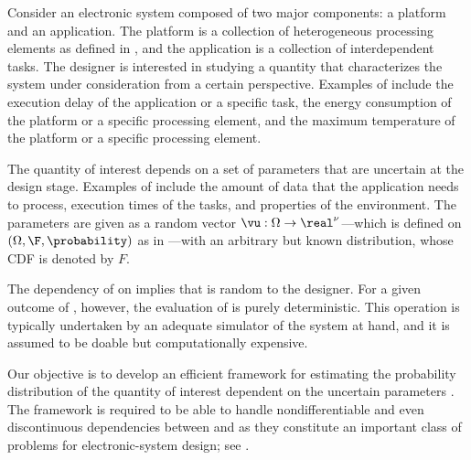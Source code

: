 Consider an electronic system composed of two major components: a platform and
an application. The platform is a collection of heterogeneous processing
elements as defined in , and the application is a collection
of interdependent tasks. The designer is interested in studying a quantity \g
that characterizes the system under consideration from a certain perspective.
Examples of \g include the execution delay of the application or a specific
task, the energy consumption of the platform or a specific processing element,
and the maximum temperature of the platform or a specific processing element.

The quantity of interest \g depends on a set of parameters \vu that are
uncertain at the design stage. Examples of \vu include the amount of data that
the application needs to process, execution times of the tasks, and properties
of the environment. The parameters \vu are given as a random vector $\vu: \Omega
\to \real^\nu$---which is defined on $(\Omega, \F, \probability)$ as in
---with an arbitrary but known distribution, whose
\ac{CDF} is denoted by $F$.

The dependency of \g on \vu implies that \g is random to the designer. For a
given outcome of \vu, however, the evaluation of \g is purely deterministic.
This operation is typically undertaken by an adequate simulator of the system at
hand, and it is assumed to be doable but computationally expensive.

Our objective is to develop an efficient framework for estimating the
probability distribution of the quantity of interest \g dependent on the
uncertain parameters \vu. The framework is required to be able to handle
nondifferentiable and even discontinuous dependencies between \g and \vu as they
constitute an important class of problems for electronic-system design; see
.
